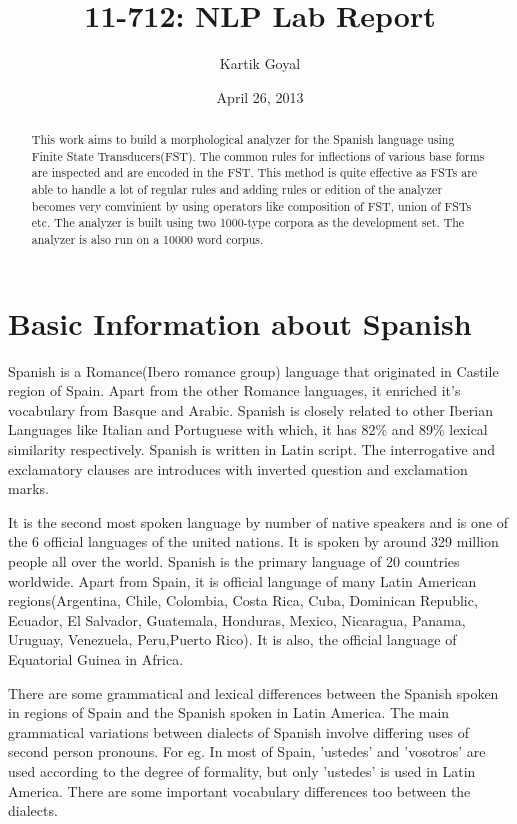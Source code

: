 \documentclass[11pt,letterpaper]{article}
\title{11-712:  NLP Lab Report}
\author{Kartik Goyal}
\date{April 26, 2013}
\begin{document}
\maketitle
\begin{abstract}
This work aims to build a morphological analyzer for the Spanish language using Finite State Transducers(FST). The common rules for inflections of various base forms are inspected and are encoded in the FST. This method is quite effective as FSTs are able to handle a lot of regular rules and adding rules or edition of the analyzer becomes very comvinient by using operators like composition of FST, union of FSTs etc. The analyzer is built using two 1000-type corpora as the development set. The analyzer is also run on a 10000 word corpus.
\end{abstract}


\section{Basic Information about Spanish}

Spanish is a Romance(Ibero romance group) language that originated in Castile region of Spain. Apart from the other Romance languages, it enriched it's vocabulary from Basque and Arabic. Spanish is closely related to other Iberian Languages like Italian and Portuguese with which, it has 82\% and 89\% lexical similarity respectively. Spanish is written in Latin script. The interrogative and exclamatory clauses are introduces with inverted question and exclamation marks. 

It is the second most spoken language by number of native speakers and is one of the 6 official languages of the united nations. It is spoken by around 329 million people all over the world. Spanish is the primary language of 20 countries worldwide. Apart from Spain, it is official language of many Latin American regions(Argentina, Chile, Colombia, Costa Rica, Cuba, Dominican Republic, Ecuador, El Salvador, Guatemala, Honduras, Mexico, Nicaragua, Panama, Uruguay, Venezuela, Peru,Puerto Rico). It is also, the official language of Equatorial Guinea in Africa.

There are some grammatical and lexical differences between the Spanish spoken in regions of Spain and the Spanish spoken in Latin America. The main grammatical variations between dialects of Spanish involve differing uses of second person pronouns. For eg. In most of Spain, 'ustedes' and 'vosotros' are used according to the degree of formality, but only 'ustedes' is used in Latin America. There are some important vocabulary differences too between the dialects.
\end{document}
